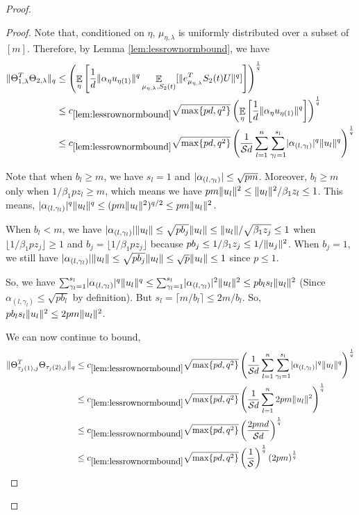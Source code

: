 \documentclass[11pt]{amsart}
\numberwithin{equation}{section}
\numberwithin{equation}{section}
\DeclareMathOperator{\E}{\mathbb{E}}
\DeclarePairedDelimiter{\norm}{\lVert}{\rVert}
\DeclarePairedDelimiter{\abs}{\lvert}{\rvert}
\theoremstyle{remark}
\theoremstyle{definition}
\begin{document}
\begin{proof}
\begin{proof}
Note that, conditioned on $\eta$, $\mu_{\eta, \lambda}$ is uniformly distributed over a subset of $[m]$. Therefore, by Lemma \ref{lem:lessrownormbound}, we have  
\begin{align*}
    \norm{\Theta_{1,\lambda}^T\Theta_{2,\lambda}}_{q} &\le \left( \E_{\eta} \left[ \frac{1}{d} \norm{\alpha_{\eta} u_{\eta(1)} }^{q} \E_{\mu_{\eta, \lambda}, S_2(t)}[ \norm{e_{\mu_{\eta,\lambda}}^TS_2(t)U}^{q}] \right] \right)^\frac{1}{q} \\
    &\le c_{\ref*{lem:lessrownormbound}}\sqrt{\max \{ pd, q^2 \}} \left( \E_{\eta} \left[ \frac{1}{d} \norm{\alpha_{\eta} u_{\eta(1)} }^{q} \right] \right)^\frac{1}{q} \\
&\le c_{\ref*{lem:lessrownormbound}}\sqrt{\max \{ pd, q^2 \}} \left( \frac{1}{\mathcal{S}d} \sum_{l=1}^n \sum_{\gamma_l=1}^{s_l} \abs{\alpha_{(l,\gamma_l)}}^{q} \norm{u_l}^{q} \right)^\frac{1}{q} \\
\end{align*}


Note that when $b_l \ge m$, we have $s_l=1$ and $\abs{\alpha_{(l,\gamma_l)}} \le \sqrt{pm}$. Moreover, $b_l \ge m$ only when $1/\beta_1pz_l \ge m$, which means we have $pm\norm{u_l}^2 \le \norm{u_l}^2/\beta_1z_l \le 1$. This means, $\abs{\alpha_{(l,\gamma_l)}}^{q} \norm{u_l}^{q} \le (pm\norm{u_l}^2)^{q/2} \le pm\norm{u_l}^2$.

When $b_l < m$, we have $\abs{\alpha_{(l,\gamma_l)}}\norm{u_l} \le \sqrt{pb_j}\norm{u_l} \le \norm{u_l}/\sqrt{\beta_1z_j} \le 1$ when $\lfloor 1/\beta_1pz_j \rfloor \ge 1$ and $b_j = \lfloor 1/\beta_1pz_j \rfloor$ because $pb_j \le 1/\beta_1z_j \le 1/\norm{u_j}^2$.
    When $b_j=1$, we still have $\abs{\alpha_{(l,\gamma_l)}}\norm{u_l} \le \sqrt{pb_j}\norm{u_l} \le \sqrt{p}\norm{u_l} \le 1$ since $p \le 1$.

So, we have $\sum_{\gamma_l=1}^{s_l} \abs{\alpha_{(l,\gamma_l)}}^{q} \norm{u_l}^{q} \le \sum_{\gamma_l=1}^{s_l} \abs{\alpha_{(l,\gamma_l)}}^{2} \norm{u_l}^{2} \le pb_l s_l \norm{u_l}^{2}$ (Since $\alpha_{(l,\gamma_l)} \le \sqrt{p b_l}$ by definition). But $s_l = \lceil m/b_l \rceil \le 2m/b_l$. So, $pb_l s_l \norm{u_l}^{2} \le 2pm \norm{u_l}^{2} $.


We can now continue to bound,
\begin{align*}
\norm{\Theta_{\tau_j(1),j}^T\Theta_{\tau_j(2),j}}_{q} &\le c_{\ref*{lem:lessrownormbound}}\sqrt{\max \{ pd, q^2 \}} \left( \frac{1}{\mathcal{S}d} \sum_{l=1}^n \sum_{\gamma_l=1}^{s_l} \abs{\alpha_{(l,\gamma_l)}}^{q} \norm{u_l}^{q} \right)^\frac{1}{q} \\
    &\le c_{\ref*{lem:lessrownormbound}}\sqrt{\max \{ pd, q^2 \}} \left( \frac{1}{\mathcal{S}d} \sum_{l=1}^n  2pm\norm{u_l}^2   \right)^\frac{1}{q} \\
    &\le c_{\ref*{lem:lessrownormbound}}\sqrt{\max \{ pd, q^2 \}} \left( \frac{2pmd}{\mathcal{S}d}  \right)^\frac{1}{q} \\
    &\le c_{\ref*{lem:lessrownormbound}}\sqrt{\max \{ pd, q^2 \}} \left( \frac{1}{\mathcal{S}}  \right)^\frac{1}{q} \left( 2pm  \right)^\frac{1}{q}
\end{align*}
\end{proof}


\end{proof}
\end{document}
